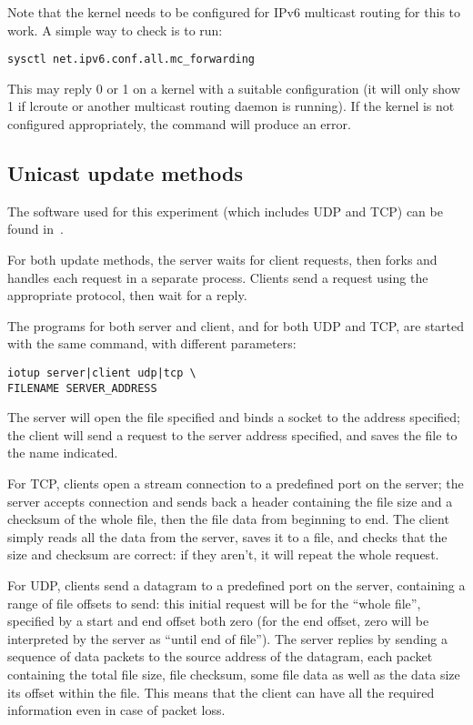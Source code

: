 \documentclass[a4paper,11pt,twocolumn]{article}
\begin{document}
Note that the kernel needs to be configured for IPv6 multicast routing
for this to work. A simple way to check is to run:

\begin{verbatim}
sysctl net.ipv6.conf.all.mc_forwarding
\end{verbatim}

This may reply 0 or 1 on a kernel with a suitable configuration (it
will only show 1 if lcroute or another multicast routing daemon
is running).  If the kernel is not configured appropriately, the
command will produce an error.

\subsection{Unicast update methods}
\label{unisync}

The software used for this experiment (which includes UDP and TCP) can
be found in~\cite{unisync:sources}.

For both update methods, the server waits for client requests, then
forks and handles each request in a separate process. Clients send
a request using the appropriate protocol, then wait for a reply.

The programs for both server and client, and for both UDP and TCP,
are started with the same command, with different parameters:

\begin{verbatim}
iotup server|client udp|tcp \
FILENAME SERVER_ADDRESS
\end{verbatim}

The server will open the file specified and binds a socket to the
address specified; the client will send a request to the server
address specified, and saves the file to the name indicated.

For TCP, clients open a stream connection to a predefined port on
the server; the server accepts connection and sends back a header
containing the file size and a checksum of the whole file, then
the file data from beginning to end. The client simply reads all
the data from the server, saves it to a file, and checks that
the size and checksum are correct: if they aren't, it will repeat
the whole request.

For UDP, clients send a datagram to a predefined port on the server,
containing a range of file offsets to send: this initial request
will be for the ``whole file'', specified by a start and end offset
both zero (for the end offset, zero will be interpreted by the
server as ``until end of file''). The server replies by sending
a sequence of data packets to the source address of the datagram,
each packet containing the total file size, file checksum, some
file data as well as the data size its offset within the file.
This means that the client can have all the required information
even in case of packet loss.
\end{document}
